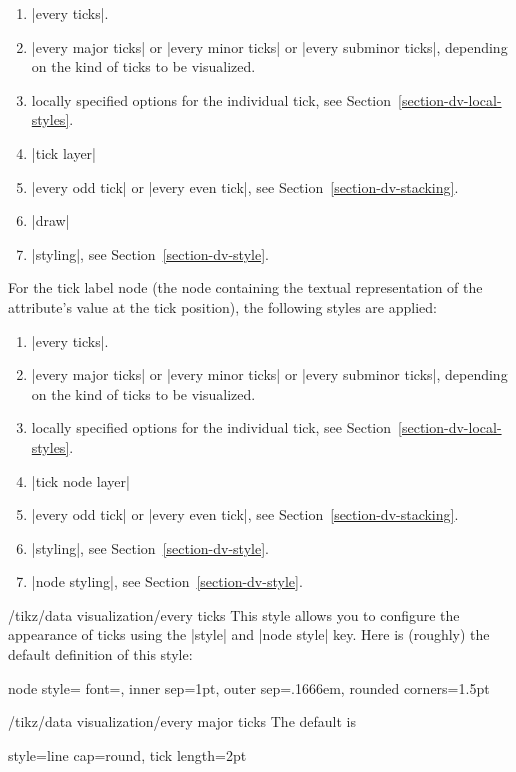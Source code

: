 \begin{enumerate}
\item
  |every ticks|.
\item |every major ticks| or |every minor ticks| or
  |every subminor ticks|, depending on the kind of ticks to be
  visualized. 
\item
  locally specified options for the individual tick, see
  Section~\ref{section-dv-local-styles}. 
\item
  |tick layer|
\item
  |every odd tick| or |every even tick|, see Section~\ref{section-dv-stacking}.
\item
  |draw|
\item
  |styling|, see Section~\ref{section-dv-style}.
\end{enumerate}

For the tick label node (the node containing the textual
representation of the attribute's value at the tick position), the
following styles are applied:

\begin{enumerate}
\item
  |every ticks|.
\item |every major ticks| or |every minor ticks| or
  |every subminor ticks|, depending on the kind of ticks to be
  visualized. 
\item
  locally specified options for the individual tick, see
  Section~\ref{section-dv-local-styles}. 
\item
  |tick node layer| 
\item
  |every odd tick| or |every even tick|, see Section~\ref{section-dv-stacking}.
\item
  |styling|, see Section~\ref{section-dv-style}.
\item
  |node styling|, see Section~\ref{section-dv-style}.
\end{enumerate}

\begin{stylekey}{/tikz/data visualization/every ticks}
  This style allows you to configure the appearance of ticks using the
  |style| and |node style| key. Here is (roughly) the default
  definition of this style:
\begin{codeexample}
node style={
  font=\footnotesize,
  inner sep=1pt,
  outer sep=.1666em,
  rounded corners=1.5pt
}    
\end{codeexample}
\end{stylekey}

\begin{stylekey}{/tikz/data visualization/every major ticks}
  The default is
\begin{codeexample}
  style={line cap=round}, tick length=2pt
\end{codeexample}
\end{stylekey}


